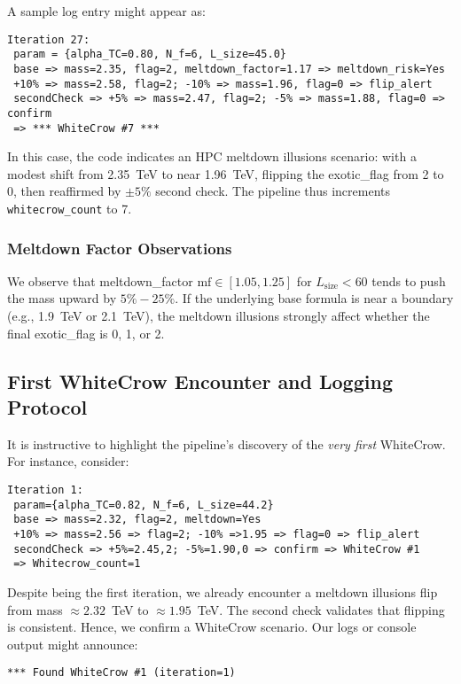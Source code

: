 \documentclass[11pt]{article}
\begin{document}
A sample log entry might appear as:

\begin{verbatim}
Iteration 27:
 param = {alpha_TC=0.80, N_f=6, L_size=45.0}
 base => mass=2.35, flag=2, meltdown_factor=1.17 => meltdown_risk=Yes
 +10% => mass=2.58, flag=2; -10% => mass=1.96, flag=0 => flip_alert
 secondCheck => +5% => mass=2.47, flag=2; -5% => mass=1.88, flag=0 => confirm
 => *** WhiteCrow #7 ***
\end{verbatim}

In this case, the code indicates an HPC meltdown illusions scenario:
with a modest shift from 2.35~TeV to near 1.96~TeV, flipping the exotic\_flag
from 2 to 0, then reaffirmed by $\pm 5\%$ second check. The pipeline thus increments
\texttt{whitecrow\_count} to 7.

\subsubsection{Meltdown Factor Observations}
We observe that meltdown\_factor $\mathrm{mf}\in[1.05,1.25]$ for $L_{\mathrm{size}}<60$
tends to push the mass upward by $5\%-25\%$. If the underlying base formula
is near a boundary (e.g., 1.9~TeV or 2.1~TeV), the meltdown illusions strongly
affect whether the final exotic\_flag is 0, 1, or 2.

\subsection{First WhiteCrow Encounter and Logging Protocol}

It is instructive to highlight the pipeline's discovery
of the \textit{very first} WhiteCrow. For instance, consider:

\begin{verbatim}
Iteration 1:
 param={alpha_TC=0.82, N_f=6, L_size=44.2}
 base => mass=2.32, flag=2, meltdown=Yes
 +10% => mass=2.56 => flag=2; -10% =>1.95 => flag=0 => flip_alert
 secondCheck => +5%=2.45,2; -5%=1.90,0 => confirm => WhiteCrow #1
 => Whitecrow_count=1
\end{verbatim}

Despite being the first iteration, we already encounter a meltdown illusions flip
from mass $\approx 2.32$~TeV to $\approx 1.95$~TeV. The second check
validates that flipping is consistent. Hence, we confirm a WhiteCrow scenario.
Our logs or console output might announce:

\begin{verbatim}
*** Found WhiteCrow #1 (iteration=1)
\end{verbatim}
\end{document}
